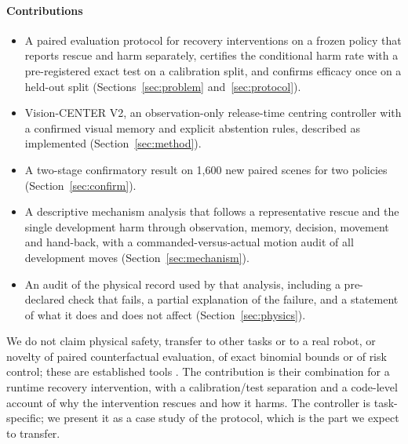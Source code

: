 \paragraph{Contributions}
\begin{itemize}
\item A paired evaluation protocol for recovery interventions on a frozen policy that reports rescue and harm separately, certifies the conditional harm rate with a pre-registered exact test on a calibration split, and confirms efficacy once on a held-out split (Sections~\ref{sec:problem} and~\ref{sec:protocol}).
\item Vision-CENTER V2, an observation-only release-time centring controller with a confirmed visual memory and explicit abstention rules, described as implemented (Section~\ref{sec:method}).
\item A two-stage confirmatory result on 1,600 new paired scenes for two policies (Section~\ref{sec:confirm}).
\item A descriptive mechanism analysis that follows a representative rescue and the single development harm through observation, memory, decision, movement and hand-back, with a commanded-versus-actual motion audit of all development moves (Section~\ref{sec:mechanism}).
\item An audit of the physical record used by that analysis, including a pre-declared check that fails, a partial explanation of the failure, and a statement of what it does and does not affect (Section~\ref{sec:physics}).
\end{itemize}

We do not claim physical safety, transfer to other tasks or to a real robot, or novelty of paired counterfactual evaluation, of exact binomial bounds or of risk control; these are established tools \cite{clopper1934,holm1979,angelopoulos2021ltt,ahmedt2026rescue}. The contribution is their combination for a runtime recovery intervention, with a calibration/test separation and a code-level account of why the intervention rescues and how it harms. The controller is task-specific; we present it as a case study of the protocol, which is the part we expect to transfer.

